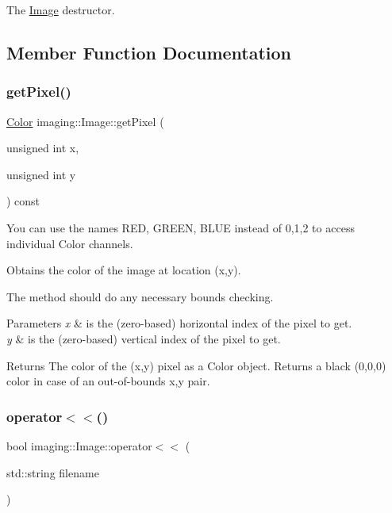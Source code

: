 The \hyperlink{classimaging_1_1_image}{Image} destructor. 

\subsection{Member Function Documentation}
\mbox{\label{classimaging_1_1_image_acb9fc398bbd5224553cccd7458f73279}} 
\subsubsection{\texorpdfstring{get\+Pixel()}{getPixel()}}
{\footnotesize\ttfamily \hyperlink{classmath_1_1_vec3}{Color} imaging\+::\+Image\+::get\+Pixel (\begin{DoxyParamCaption}\item[{unsigned int}]{x,  }\item[{unsigned int}]{y }\end{DoxyParamCaption}) const}



You can use the names R\+ED, G\+R\+E\+EN, B\+L\+UE instead of 0,1,2 to access individual Color channels. 

Obtains the color of the image at location (x,y).

The method should do any necessary bounds checking.


\begin{DoxyParams}{Parameters}
{\em x} & is the (zero-\/based) horizontal index of the pixel to get. \\
\hline
{\em y} & is the (zero-\/based) vertical index of the pixel to get.\\
\hline
\end{DoxyParams}
\begin{DoxyReturn}{Returns}
The color of the (x,y) pixel as a Color object. Returns a black (0,0,0) color in case of an out-\/of-\/bounds x,y pair. 
\end{DoxyReturn}
\mbox{\label{classimaging_1_1_image_ac9ad6b7cf9eabf0c99decc03dac24694}} 
\subsubsection{\texorpdfstring{operator$<$$<$()}{operator<<()}}
{\footnotesize\ttfamily bool imaging\+::\+Image\+::operator$<$$<$ (\begin{DoxyParamCaption}\item[{std\+::string}]{filename }\end{DoxyParamCaption})\hspace{0.3cm}{\ttfamily [virtual]}}

